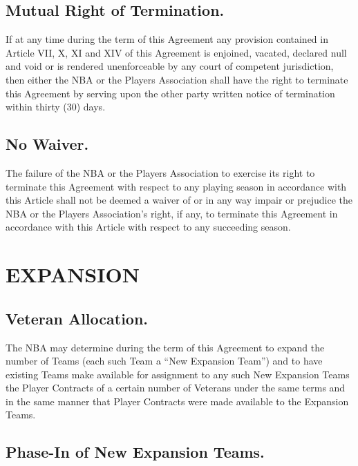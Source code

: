 \documentclass[
]{book}
\begin{document}
\hypertarget{mutual-right-of-termination.}{%
\section{Mutual Right of Termination.}\label{mutual-right-of-termination.}}

If at any time during the term of this Agreement any provision contained in Article VII, X, XI and XIV of this Agreement is enjoined, vacated, declared null and void or is rendered unenforceable by any court of competent jurisdiction, then either the NBA or the Players Association shall have the right to terminate this Agreement by serving upon the other party written notice of termination within thirty (30) days.

\hypertarget{no-waiver.}{%
\section{No Waiver.}\label{no-waiver.}}

The failure of the NBA or the Players Association to exercise its right to terminate this Agreement with respect to any playing season in accordance with this Article shall not be deemed a waiver of or in any way impair or prejudice the NBA or the Players Association's right, if any, to terminate this Agreement in accordance with this Article with respect to any succeeding season.

\hypertarget{expansion}{%
\chapter{EXPANSION}\label{expansion}}

\hypertarget{veteran-allocation.}{%
\section{Veteran Allocation.}\label{veteran-allocation.}}

The NBA may determine during the term of this Agreement to expand the number of Teams (each such Team a ``New Expansion Team'') and to have existing Teams make available for assignment to any such New Expansion Teams the Player Contracts of a certain number of Veterans under the same terms and in the same manner that Player Contracts were made available to the Expansion Teams.

\hypertarget{phase-in-of-new-expansion-teams.}{%
\section{Phase-In of New Expansion Teams.}\label{phase-in-of-new-expansion-teams.}}
\end{document}
